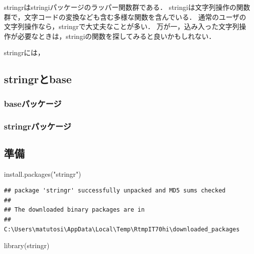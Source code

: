\documentclass[
]{article}
\newenvironment{Shaded}{\begin{snugshade}}{\end{snugshade}}
\newcommand{\FunctionTok}[1]{\textcolor[rgb]{0.00,0.00,0.00}{#1}}
\newcommand{\NormalTok}[1]{#1}
\newcommand{\StringTok}[1]{\textcolor[rgb]{0.31,0.60,0.02}{#1}}
\begin{document}
stringrはstringiパッケージのラッパー関数群である．
stringiは文字列操作の関数群で，文字コードの変換なども含む多様な関数を含んでいる．
通常のユーザの文字列操作なら，stringrで大丈夫なことが多い．
万が一，込み入った文字列操作が必要なときは，stringiの関数を探してみると良いかもしれない．

stringrには，

\hypertarget{stringrux3068base}{%
\subsection{stringrとbase}\label{stringrux3068base}}

\hypertarget{baseux30d1ux30c3ux30b1ux30fcux30b8-1}{%
\subsubsection{baseパッケージ}\label{baseux30d1ux30c3ux30b1ux30fcux30b8-1}}

\hypertarget{stringrux30d1ux30c3ux30b1ux30fcux30b8}{%
\subsubsection{stringrパッケージ}\label{stringrux30d1ux30c3ux30b1ux30fcux30b8}}

\hypertarget{ux6e96ux5099-1}{%
\subsection{準備}\label{ux6e96ux5099-1}}

\begin{Shaded}
\begin{Highlighting}[]
\FunctionTok{install.packages}\NormalTok{(}\StringTok{"stringr"}\NormalTok{)}
\end{Highlighting}
\end{Shaded}

\begin{verbatim}
## package 'stringr' successfully unpacked and MD5 sums checked
## 
## The downloaded binary packages are in
##  C:\Users\matutosi\AppData\Local\Temp\RtmpIT70hi\downloaded_packages
\end{verbatim}

\begin{Shaded}
\begin{Highlighting}[]
\FunctionTok{library}\NormalTok{(stringr)}
\end{Highlighting}
\end{Shaded}
\end{document}
